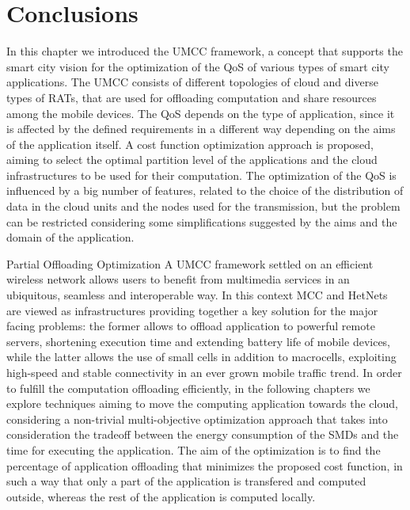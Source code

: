 \documentclass[twoside,openright]{report}
\makeatletter
\let\LaTeXStandardPart\part%
\newcommand{\unstarredpart@@noopt}[1]{%
  \unstarredpart@@opt[#1]{#1}%
}%
\newcommand{\unstarredpart@@opt}[2][]{%
  \cleardoublepage%
  \begingroup%
  \let\newpage\relax%
  \LaTeXStandardPart[#1]{#2}%
  \endgroup%
}%
\newcommand{\starredpart}[1]{%
  \LaTeXStandardPart*{#1}%
}%
\newcommand{\unstarredpart}{%
  \@ifnextchar[{\unstarredpart@@opt}{\unstarredpart@@noopt}%
}%
\renewcommand{\part}{%
  \@ifstar{\starredpart}{\unstarredpart}%
}%
\makeatother
\begin{document}
\section{Conclusions}
\label{sec:conclusions1}
In this chapter we introduced the \gls{UMCC} framework, a concept that supports the smart city vision for the optimization of the \gls{QoS} of various types of smart city applications. 
The \gls{UMCC} consists of different topologies of cloud and diverse types of \glspl{RAT}, that are used for offloading computation and share resources among the mobile devices. 
The \gls{QoS} depends on the type of application, since it is affected by the defined requirements in a different way depending on the aims of the application itself. 
A cost function optimization approach is proposed, aiming to select the optimal partition level of the applications and the cloud infrastructures to be used for their computation. 
The optimization of the \gls{QoS} is influenced by a big number of features, related to the choice of the distribution of data in the cloud units and the nodes used for the transmission, but the problem can be restricted considering some simplifications suggested by the aims and the domain of the application. 

\part{Partial Offloading Optimization}
A \gls{UMCC} framework settled on an efficient wireless network allows users to benefit from multimedia services in an ubiquitous, seamless and interoperable way. 
In this context \gls{MCC} and \glspl{HetNet} are viewed as infrastructures providing together a key solution for the major facing problems: the former allows to offload application to powerful remote servers, shortening execution time and extending battery life of mobile devices, while the latter allows the use of small cells in addition to macrocells, exploiting high-speed and stable connectivity in an ever grown mobile traffic trend.
In order to fulfill the computation offloading efficiently, in the following chapters we explore techniques aiming to move the computing application towards the cloud, considering a non-trivial multi-objective optimization approach that takes into consideration the tradeoff between the energy consumption of the \glspl{SMD} and the time for executing the application. 
The aim of the optimization is to find the percentage of application offloading  that minimizes the proposed cost function, in such a way that only a part of the application is transfered and computed outside, whereas the rest of the application is computed locally.
\end{document}
